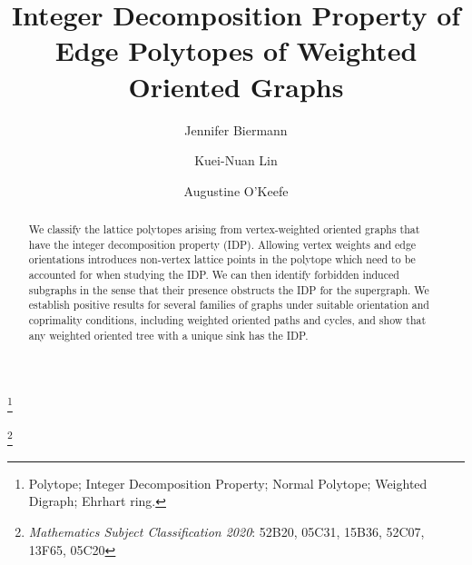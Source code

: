 \documentclass [12pt,a4paper,reqno]{amsart}
\theoremstyle{plain}
\theoremstyle{definition}
\newtheorem{Assumptions and Discussion}[Theorem]{Assumptions and Discussion}
\theoremstyle{remark}
\begin{document}
%

%

\title[IDP of Edge Polytopes of Weighted Oriented Graphs]{Integer Decomposition Property of Edge Polytopes of Weighted Oriented Graphs}



\thanks{Polytope; Integer Decomposition Property; Normal Polytope; Weighted Digraph; Ehrhart ring.}

\thanks{{\em Mathematics Subject Classification 2020}:  52B20, 05C31, 15B36, 52C07, 13F65, 05C20}




\author[Biermann]{Jennifer Biermann}
\address{Department of Mathematics and Computer Science, Hobart and William Smith Colleges \\
300 Pulteney St.
Geneva, NY 14456, USA}





\author[Lin]{Kuei-Nuan Lin}
\address{Department of Mathematics,
Penn State University\\ 4000 University Dr, McKeesport, PA 15132, USA}


\author[O'Keefe]{Augustine O'Keefe}
\address{Department of Mathematics and Statistics, Connecticut College\\
270 Mohegan Avenue Pkwy,
New London, CT 06320, USA}



\maketitle



\begin{abstract}
We classify the lattice polytopes arising from vertex-weighted oriented graphs that have the integer decomposition property (IDP). Allowing vertex weights and edge orientations introduces non-vertex lattice points in the polytope which need to be accounted for when studying the IDP. We can then identify forbidden induced subgraphs in the sense that their presence obstructs the IDP for the supergraph. We establish positive results for several families of graphs under suitable orientation and coprimality conditions, including weighted oriented paths and cycles, and show that any weighted oriented tree with a unique sink has the IDP.
\end{abstract}
\end{document}
